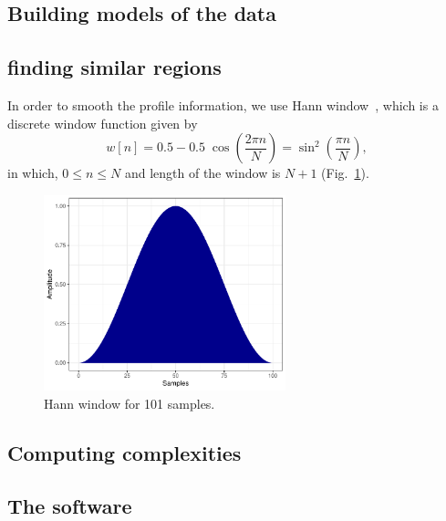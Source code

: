 \subsection{Building models of the data}

\subsection{finding similar regions}

In order to smooth the profile information, we use Hann window~\cite{blackman1959particular}, which is a discrete window function given by
\begin{equation}
  \label{eq.hann}
  w[n]=0.5-0.5\;\cos \left({\frac {2\pi n}{N}}\right)=\sin ^{2}\left({\frac {\pi n}{N}}\right),
\end{equation}
in which, $0\le n\le N$ and length of the window is $N+1$ (Fig.~\ref{fig.hann}).

\begin{figure}[!h]
  \centering
\includegraphics[width=7cm]{hann.pdf}
\caption{Hann window for 101 samples.}
\label{fig.hann}
\end{figure}

\subsection{Computing complexities}

\subsection{The software}


